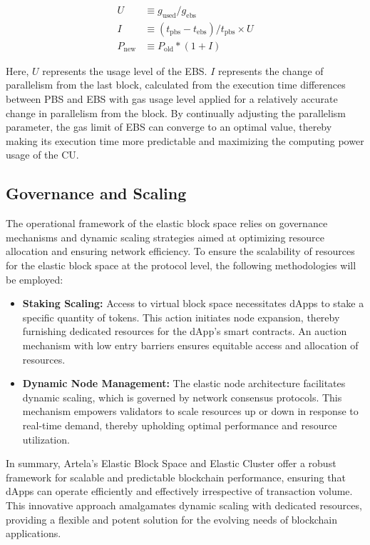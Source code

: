 \begin{align}
U &\equiv g_\text{used} / g_\text{ebs} \\
I &\equiv (t_\text{pbs} - t_\text{ebs}) / t_\text{pbs} \times U \\
P_\text{new} &\equiv P_\text{old} * (1 + I)
\end{align}

Here, $U$ represents the usage level of the EBS. $I$ represents the change of parallelism from the last block, calculated from the execution time differences between PBS and EBS with gas usage level applied for a relatively accurate change in parallelism from the block. By continually adjusting the parallelism parameter, the gas limit of EBS can converge to an optimal value, thereby making its execution time more predictable and maximizing the computing power usage of the CU.

\subsection{Governance and Scaling}

The operational framework of the elastic block space relies on governance mechanisms and dynamic scaling strategies aimed at optimizing resource allocation and ensuring network efficiency. To ensure the scalability of resources for the elastic block space at the protocol level, the following methodologies will be employed:

\begin{itemize}
\item \textbf{Staking Scaling:} Access to virtual block space necessitates dApps to stake a specific quantity of tokens. This action initiates node expansion, thereby furnishing dedicated resources for the dApp’s smart contracts. An auction mechanism with low entry barriers ensures equitable access and allocation of resources.
\item \textbf{Dynamic Node Management:} The elastic node architecture facilitates dynamic scaling, which is governed by network consensus protocols. This mechanism empowers validators to scale resources up or down in response to real-time demand, thereby upholding optimal performance and resource utilization.
\end{itemize}

In summary, Artela's Elastic Block Space and Elastic Cluster offer a robust framework for scalable and predictable blockchain performance, ensuring that dApps can operate efficiently and effectively irrespective of transaction volume. This innovative approach amalgamates dynamic scaling with dedicated resources, providing a flexible and potent solution for the evolving needs of blockchain applications.
